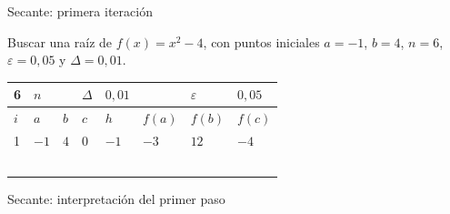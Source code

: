 \documentclass[main.tex]{subfiles}
\begin{document}
\begin{frame}[t]{Secante: primera iteración}
\begin{minipage}[t][13mm][t]{\textwidth}\small Buscar una raíz de $f(x)=x^2-4$, con puntos iniciales $a=-1$, $b=4$, $n=6$, $\varepsilon=0{,}05$ y $\Delta=0{,}01$.\end{minipage}\par{\scriptsize\setlength{\tabcolsep}{2pt}\renewcommand{\arraystretch}{1}\begin{center}\begin{tabular}{|C{.04\textwidth}|C{.112\textwidth}|C{.112\textwidth}|C{.112\textwidth}|C{.112\textwidth}|C{.112\textwidth}|C{.112\textwidth}|C{.112\textwidth}|}
\hline
\rule{0pt}{4.3mm}6 & $n$ &  &  $\Delta$  & $0{,}01$ &  & $\varepsilon$ & $0{,}05$\\\hline
\rule{0pt}{4.3mm}$i$ & $a$ & $b$ & $c$ & $h$ & $f(a)$ & $f(b)$ & $f(c)$\\\hline
\rule{0pt}{4.3mm}1 & $-1$ & $4$ & $0$ & $-1$ & $-3$ & $12$ & $-4$\\\hline
\rule{0pt}{4.3mm} &  &  &  &  &  &  & \\\hline
\rule{0pt}{4.3mm} &  &  &  &  &  &  & \\\hline
\rule{0pt}{4.3mm} &  &  &  &  &  &  & \\\hline
\rule{0pt}{4.3mm} &  &  &  &  &  &  & \\\hline
\rule{0pt}{4.3mm} &  &  &  &  &  &  & \\\hline
\end{tabular}\end{center}}\begin{minipage}[t][10mm][t]{\textwidth}\footnotesize \end{minipage}
\end{frame}

\begin{frame}{Secante: interpretación del primer paso}
\end{frame}
\end{document}
